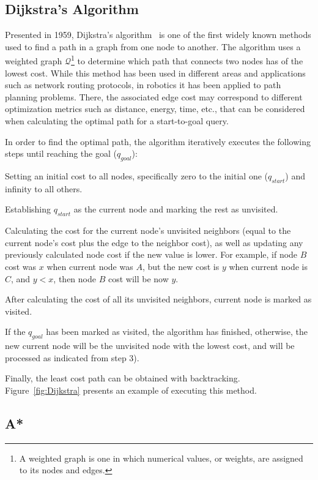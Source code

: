 \subsection{Dijkstra's Algorithm}

Presented in 1959, Dijkstra's algorithm~\cite{Dijkstra1959} is one of the first
widely known methods used to find a path in a graph from one node to another.
The algorithm uses a weighted graph $\mathcal{Q}$\footnote{A weighted graph is
one in which numerical values, or weights, are assigned to its nodes and edges.}
to determine which path that connects two nodes has of the lowest cost. While
this method has been used in different areas and applications such as network
routing protocols, in robotics it has been applied to path planning problems.
There, the associated edge cost may correspond to different optimization metrics
such as distance, energy, time, etc., that can be considered when calculating
the optimal path for a start-to-goal query.

In order to find the optimal path, the algorithm iteratively executes the
following steps until reaching the goal ($q_{goal}$):
\begin{inparaenum}[1)] \item Setting an initial cost to all nodes, specifically
zero to the initial one ($q_{start}$) and infinity to all others.
\item Establishing $q_{start}$ as the current node and marking the rest as
unvisited.
\item Calculating the cost for the current node's unvisited neighbors (equal to
the current node's cost plus the edge to the neighbor cost), as well as updating
any previously calculated node cost if the new value is lower.
For example, if node $B$ cost was $x$ when current node was $A$, but the new
cost is $y$ when current node is $C$, and $y<x$, then node $B$ cost will be now
$y$.
\item After calculating the cost of all its unvisited neighbors, current
node is marked as visited.
\item If the $q_{goal}$ has been marked as visited, the algorithm has finished,
otherwise, the new current node will be the unvisited node with the lowest
cost, and will be processed as indicated from step 3).
\end{inparaenum}
Finally, the least cost path can be obtained with backtracking.
Figure~\ref{fig:Dijkstra} presents an example of executing this method.

\subsection{A*}

